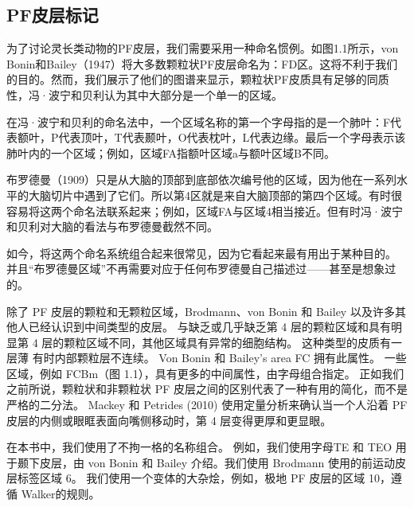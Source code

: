 \subsection{PF皮层标记}
为了讨论灵长类动物的PF皮层，我们需要采用一种命名惯例。如图1.1所示，von Bonin和Bailey（1947）将大多数颗粒状PF皮层命名为：FD区。这将不利于我们的目的。然而，我们展示了他们的图谱来显示，颗粒状PF皮质具有足够的同质性，冯·波宁和贝利认为其中大部分是一个单一的区域。
\par
在冯·波宁和贝利的命名法中，一个区域名称的第一个字母指的是一个肺叶：F代表额叶，P代表顶叶，T代表颞叶，O代表枕叶，L代表边缘。最后一个字母表示该肺叶内的一个区域；例如，区域FA指额叶区域a与额叶区域B不同。
\par
布罗德曼（1909）只是从大脑的顶部到底部依次编号他的区域，因为他在一系列水平的大脑切片中遇到了它们。所以第4区就是来自大脑顶部的第四个区域。有时很容易将这两个命名法联系起来；例如，区域FA与区域4相当接近。但有时冯·波宁和贝利对大脑的看法与布罗德曼截然不同。
\par
如今，将这两个命名系统组合起来很常见，因为它看起来最有用出于某种目的。 并且“布罗德曼区域”不再需要对应于任何布罗德曼自己描述过——甚至是想象过的。
\par
除了 PF 皮层的颗粒和无颗粒区域，Brodmann、von Bonin 和 Bailey 以及许多其他人已经认识到中间类型的皮层。 与缺乏或几乎缺乏第 4 层的颗粒区域和具有明显第 4 层的颗粒区域不同，其他区域具有异常的细胞结构。 这种类型的皮质有一层薄
有时内部颗粒层不连续。 Von Bonin 和 Bailey's area FC 拥有此属性。 一些区域，例如 FCBm（图 1.1），具有更多的中间属性，由字母组合指定。 正如我们之前所说，颗粒状和非颗粒状 PF 皮层之间的区别代表了一种有用的简化，而不是严格的二分法。 Mackey 和 Petrides (2010) 使用定量分析来确认当一个人沿着 PF 皮层的内侧或眼眶表面向嘴侧移动时，第 4 层变得更厚和更显眼。
\par
在本书中，我们使用了不拘一格的名称组合。 例如，我们使用字母TE 和 TEO 用于颞下皮层，由 von Bonin 和 Bailey 介绍。我们使用 Brodmann 使用的前运动皮层标签区域 6。 我们使用一个变体的大杂烩，例如，极地 PF 皮层的区域 10，遵循 Walker的规则。
